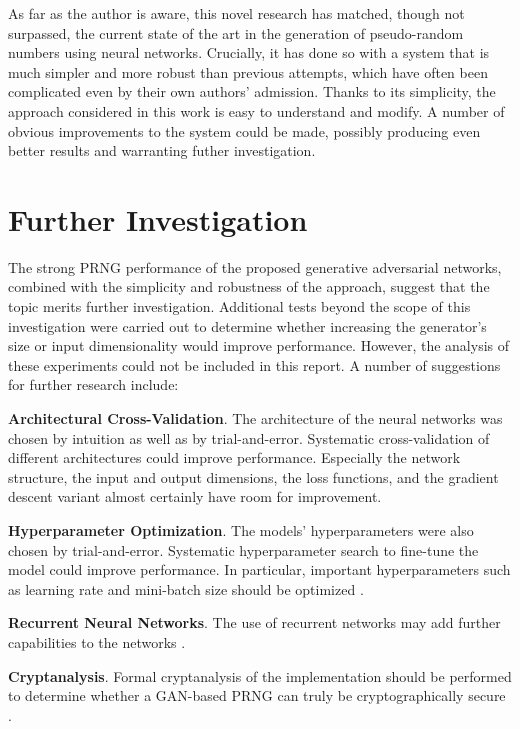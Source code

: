 \documentclass[12pt, titlepage]{report}
\theoremstyle{definition}
\begin{document}
As far as the author is aware, this novel research has matched, though not surpassed, the current state of the art in the generation of pseudo-random numbers using neural networks. Crucially, it has done so with a system that is much simpler and more robust than previous attempts, which have often been complicated even by their own authors' admission. Thanks to its simplicity, the approach considered in this work is easy to understand and modify. A number of obvious improvements to the system could be made, possibly producing even better results and warranting futher investigation.




\chapter{Further Investigation}
The strong PRNG performance of the proposed generative adversarial networks, combined with the simplicity and robustness of the approach, suggest that the topic merits further investigation.
Additional tests beyond the scope of this investigation were carried out to determine whether increasing the generator's size or input dimensionality would improve performance. However, the analysis of these experiments could not be included in this report. A number of suggestions for further research include:

\textbf{Architectural Cross-Validation}. The architecture of the neural networks was chosen by intuition as well as by trial-and-error. Systematic cross-validation of different architectures could improve performance. Especially the network structure, the input and output dimensions, the loss functions, and the gradient descent variant almost certainly have room for improvement.

\textbf{Hyperparameter Optimization}. The models' hyperparameters were also chosen by trial-and-error. Systematic hyperparameter search to fine-tune the model could improve performance. In particular, important hyperparameters such as learning rate and mini-batch size should be optimized \cite[Neural Networks Part 3: Learning and Ealuation]{karpathy2017cs231n}.

\textbf{Recurrent Neural Networks}. The use of recurrent networks may add further capabilities to the networks \cite[chap. 10]{goodfellow2016deep}.

\textbf{Cryptanalysis}. Formal cryptanalysis of the implementation should be performed to determine whether a GAN-based PRNG can truly be cryptographically secure \cite[Abstract]{rukhin2001statistical}. 
\end{document}
